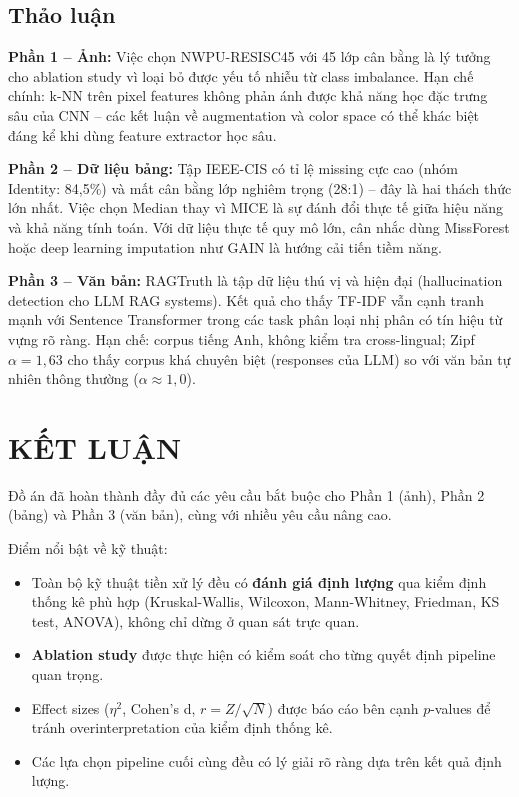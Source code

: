 \documentclass[12pt,a4paper]{article}
\let\oldtextbf\textbf
\renewcommand{\textbf}[1]{\oldtextbf{\textcolor{hcmublue}{#1}}}
\begin{document}
\subsection{Thảo luận}

\textbf{Phần 1 -- Ảnh:}
Việc chọn NWPU-RESISC45 với 45 lớp cân bằng là lý tưởng cho ablation study vì loại bỏ được yếu tố nhiễu từ class imbalance. Hạn chế chính: k-NN trên pixel features không phản ánh được khả năng học đặc trưng sâu của CNN -- các kết luận về augmentation và color space có thể khác biệt đáng kể khi dùng feature extractor học sâu.

\textbf{Phần 2 -- Dữ liệu bảng:}
Tập IEEE-CIS có tỉ lệ missing cực cao (nhóm Identity: 84,5\%) và mất cân bằng lớp nghiêm trọng (28:1) -- đây là hai thách thức lớn nhất. Việc chọn Median thay vì MICE là sự đánh đổi thực tế giữa hiệu năng và khả năng tính toán. Với dữ liệu thực tế quy mô lớn, cân nhắc dùng MissForest hoặc deep learning imputation như GAIN là hướng cải tiến tiềm năng.

\textbf{Phần 3 -- Văn bản:}
RAGTruth là tập dữ liệu thú vị và hiện đại (hallucination detection cho LLM RAG systems). Kết quả cho thấy TF-IDF vẫn cạnh tranh mạnh với Sentence Transformer trong các task phân loại nhị phân có tín hiệu từ vựng rõ ràng. Hạn chế: corpus tiếng Anh, không kiểm tra cross-lingual; Zipf $\alpha = 1{,}63$ cho thấy corpus khá chuyên biệt (responses của LLM) so với văn bản tự nhiên thông thường ($\alpha \approx 1{,}0$).

\section{KẾT LUẬN}

Đồ án đã hoàn thành đầy đủ các yêu cầu bắt buộc cho Phần 1 (ảnh), Phần 2 (bảng) và Phần 3 (văn bản), cùng với nhiều yêu cầu nâng cao.

Điểm nổi bật về kỹ thuật:
\begin{itemize}
    \item Toàn bộ kỹ thuật tiền xử lý đều có \textbf{đánh giá định lượng} qua kiểm định thống kê phù hợp (Kruskal-Wallis, Wilcoxon, Mann-Whitney, Friedman, KS test, ANOVA), không chỉ dừng ở quan sát trực quan.
    \item \textbf{Ablation study} được thực hiện có kiểm soát cho từng quyết định pipeline quan trọng.
    \item Effect sizes ($\eta^2$, Cohen's d, $r = Z/\sqrt{N}$) được báo cáo bên cạnh $p$-values để tránh overinterpretation của kiểm định thống kê.
    \item Các lựa chọn pipeline cuối cùng đều có lý giải rõ ràng dựa trên kết quả định lượng.
\end{itemize}
\end{document}
